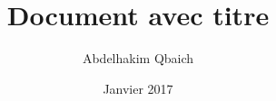 \documentclass[12pt, letterpaper]{article}
\title{Document avec titre}
\author{Abdelhakim Qbaich}
\date{Janvier 2017}
\begin{document}
\begin{titlepage}
  \maketitle
\end{titlepage}
\end{document}
